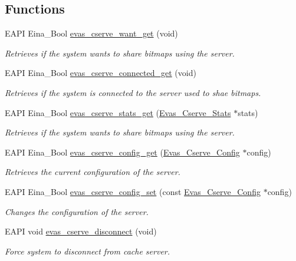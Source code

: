 \subsection*{Functions}
\begin{DoxyCompactItemize}
\item 
EAPI Eina\_\-Bool \hyperlink{group__Evas__Cserve_gab039ccd04ab2e8857a0df629b4ac0901}{evas\_\-cserve\_\-want\_\-get} (void)
\begin{DoxyCompactList}\small\item\em Retrieves if the system wants to share bitmaps using the server. \item\end{DoxyCompactList}\item 
EAPI Eina\_\-Bool \hyperlink{group__Evas__Cserve_gab88ee4c01dbdf01fea4d8acf4a07b25f}{evas\_\-cserve\_\-connected\_\-get} (void)
\begin{DoxyCompactList}\small\item\em Retrieves if the system is connected to the server used to shae bitmaps. \item\end{DoxyCompactList}\item 
EAPI Eina\_\-Bool \hyperlink{group__Evas__Cserve_ga82fec634eb97f664e9cb3ed08358b1a2}{evas\_\-cserve\_\-stats\_\-get} (\hyperlink{struct__Evas__Cserve__Stats}{Evas\_\-Cserve\_\-Stats} $\ast$stats)
\begin{DoxyCompactList}\small\item\em Retrieves if the system wants to share bitmaps using the server. \item\end{DoxyCompactList}\item 
EAPI Eina\_\-Bool \hyperlink{group__Evas__Cserve_ga9bb7fbd93f4bc9310707549ff9427b47}{evas\_\-cserve\_\-config\_\-get} (\hyperlink{struct__Evas__Cserve__Config}{Evas\_\-Cserve\_\-Config} $\ast$config)
\begin{DoxyCompactList}\small\item\em Retrieves the current configuration of the server. \item\end{DoxyCompactList}\item 
EAPI Eina\_\-Bool \hyperlink{group__Evas__Cserve_ga10c38a7bfb59423c2a96447b42c2aa15}{evas\_\-cserve\_\-config\_\-set} (const \hyperlink{struct__Evas__Cserve__Config}{Evas\_\-Cserve\_\-Config} $\ast$config)
\begin{DoxyCompactList}\small\item\em Changes the configuration of the server. \item\end{DoxyCompactList}\item 
EAPI void \hyperlink{group__Evas__Cserve_ga3129abb4410e7d6967072f14ac327daf}{evas\_\-cserve\_\-disconnect} (void)\label{group__Evas__Cserve_ga3129abb4410e7d6967072f14ac327daf}

\begin{DoxyCompactList}\small\item\em Force system to disconnect from cache server. \item\end{DoxyCompactList}\end{DoxyCompactItemize}


